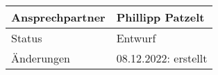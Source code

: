 \begin{table}[H]
\begin{tabularx}{\textwidth}{| l | X |}
        \hline
        Ansprechpartner & Phillipp Patzelt                                                                                                                                                                                                                                                                                \\
        \hline
        Status          & Entwurf                                                                                                                                                                                                                                                                                         \\
        \hline
        Änderungen      & 08.12.2022: erstellt                                                                                                                                                                                                                                                                            \\
        \hline
    \end{tabularx}
\end{table}

